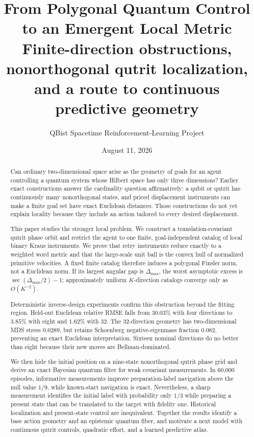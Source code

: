\documentclass[11pt]{article}
\title{\textbf{From Polygonal Quantum Control to an Emergent Local Metric}\\[0.5em]
\large Finite-direction obstructions, nonorthogonal qutrit localization,\\
and a route to continuous predictive geometry}
\author{QBist Spacetime Reinforcement-Learning Project}
\date{August 11, 2026}
\theoremstyle{definition}\newtheorem{definition}[theorem]{Definition}
\theoremstyle{remark}\newtheorem{remark}[theorem]{Remark}
\begin{document}
\maketitle

\begin{abstract}
Can ordinary two-dimensional space arise as the geometry of goals for an
agent controlling a quantum system whose Hilbert space has only three
dimensions? Earlier exact constructions answer the cardinality question
affirmatively: a qubit or qutrit has continuously many nonorthogonal states,
and priced displacement instruments can make a finite goal set have exact
Euclidean distances. Those constructions do not yet explain locality because
they include an action tailored to every desired displacement.

This paper studies the stronger local problem. We construct a
translation-covariant qutrit phase orbit and restrict the agent to one finite,
goal-independent catalog of local binary Kraus instruments. We prove that
retry instruments reduce exactly to a weighted word metric and that the
large-scale unit ball is the convex hull of normalized primitive velocities.
A fixed finite catalog therefore induces a polygonal Finsler norm, not a
Euclidean norm. If its largest angular gap is \(\Delta_{\max}\), the worst
asymptotic excess is \(\sec(\Delta_{\max}/2)-1\); approximately uniform
\(K\)-direction catalogs converge only as \(O(K^{-2})\).

Deterministic inverse-design experiments confirm this obstruction beyond the
fitting region. Held-out Euclidean relative RMSE falls from \(30.03\%\) with
four directions to \(3.85\%\) with eight and \(1.62\%\) with 32. The
32-direction geometry has two-dimensional MDS stress \(0.0289\), but retains
Schoenberg negative-eigenmass fraction \(0.082\), preventing an exact
Euclidean interpretation. Sixteen nominal directions do no better than eight
because their new moves are Bellman-dominated.

We then hide the initial position on a nine-state nonorthogonal qutrit phase
grid and derive an exact Bayesian quantum filter for weak covariant
measurements. In 60,000 episodes, informative measurements improve
preparation-label navigation above the null value \(1/9\), while known-start
navigation is exact. Nevertheless, a sharp measurement identifies the initial
label with probability only \(1/3\) while preparing a present state that can
be translated to the target with fidelity one. Historical localization and
present-state control are inequivalent. Together the results identify a base
action geometry and an epistemic quantum fiber, and motivate a next model with
continuous qutrit controls, quadratic effort, and a learned predictive atlas.
\end{abstract}
\end{document}
